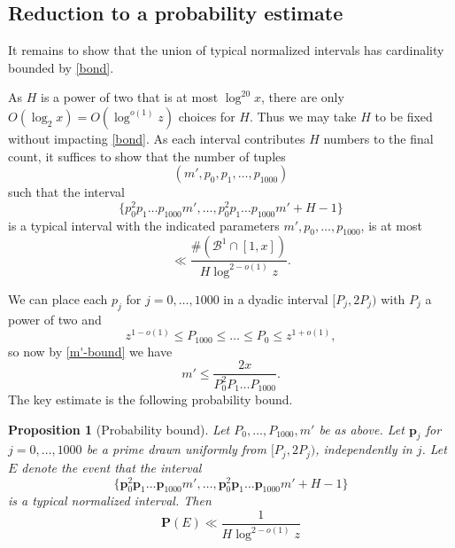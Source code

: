 \documentclass[12pt]{amsart}
\newtheorem{proposition}[theorem]{Proposition}
\renewcommand{\P}{\mathbf{P}}
\begin{document}
\subsection{Reduction to a probability estimate}

It remains to show that the union of typical normalized intervals has cardinality bounded by \eqref{bond}.

As $H$ is a power of two that is at most $\log^{20} x$, there are only $O(\log_2 x) = O(\log^{o(1)} z)$ choices for $H$.  Thus we may take $H$ to be fixed without impacting \eqref{bond}.  As each interval contributes $H$ numbers to the final count, it suffices to show that the number of tuples
\begin{equation}\label{tuple}
 (m', p_0, p_1, \dots, p_{1000})
\end{equation}
such that the interval
\begin{equation}\label{pong}
 \{ p_0^2 p_1 \dots p_{1000} m', \dots, p_0^2 p_1 \dots p_{1000} m' + H - 1 \}
\end{equation}
is a typical interval with the indicated parameters $m', p_0,\dots,p_{1000}$, is at most
\begin{equation}\label{tok}
 \ll \frac{\#({\mathcal B}^1 \cap [1,x])}{H \log^{2-o(1)} z}.
 \end{equation}

We can place each $p_j$ for $j=0,\dots,1000$ in a dyadic interval $[P_j, 2P_j)$ with $P_j$ a power of two and
$$ z^{1-o(1)} \leq P_{1000} \leq \dots \leq P_{0} \leq z^{1+o(1)},$$
so now by \eqref{m'-bound} we have
\begin{equation}\label{m'-bound-alt}
    m' \leq \frac{2x}{P_0^2 P_1 \dots P_{1000}}.
\end{equation}
The key estimate is the following probability bound.

\begin{proposition}[Probability bound]\label{prop-key}  Let $P_0,\dots,P_{1000}, m'$ be as above.
Let  $\mathbf{p}_j$ for $j=0,\dots,1000$ be a prime drawn uniformly from $[P_j, 2P_j)$, independently in $j$.  Let $E$ denote the event that the interval
$$ \{ \mathbf{p}_0^2 \mathbf{p}_1 \dots \mathbf{p}_{1000} m', \dots, \mathbf{p}_0^2 \mathbf{p}_1 \dots \mathbf{p}_{1000} m' + H - 1 \} $$
is a typical normalized interval.  Then
$$ \P( E ) \ll \frac{1}{H\log^{2-o(1)} z}$$
\end{proposition}
\end{document}
